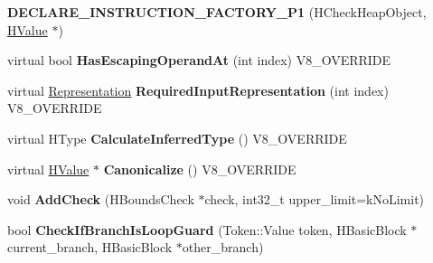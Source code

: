 \begin{DoxyCompactItemize}
\item 
\hypertarget{classv8_1_1internal_1_1_v8___f_i_n_a_l_a4567ad0527adfd674373af9969e5d0e3}{}{\bfseries D\+E\+C\+L\+A\+R\+E\+\_\+\+I\+N\+S\+T\+R\+U\+C\+T\+I\+O\+N\+\_\+\+F\+A\+C\+T\+O\+R\+Y\+\_\+\+P1} (H\+Check\+Heap\+Object, \hyperlink{classv8_1_1internal_1_1_h_value}{H\+Value} $\ast$)\label{classv8_1_1internal_1_1_v8___f_i_n_a_l_a4567ad0527adfd674373af9969e5d0e3}

\item 
\hypertarget{classv8_1_1internal_1_1_v8___f_i_n_a_l_ae559b1a39de93c2925ab5815da490738}{}virtual bool {\bfseries Has\+Escaping\+Operand\+At} (int index) V8\+\_\+\+O\+V\+E\+R\+R\+I\+D\+E\label{classv8_1_1internal_1_1_v8___f_i_n_a_l_ae559b1a39de93c2925ab5815da490738}

\item 
\hypertarget{classv8_1_1internal_1_1_v8___f_i_n_a_l_a6c6d1f37f40b113d8f4062f1ffff7215}{}virtual \hyperlink{classv8_1_1internal_1_1_representation}{Representation} {\bfseries Required\+Input\+Representation} (int index) V8\+\_\+\+O\+V\+E\+R\+R\+I\+D\+E\label{classv8_1_1internal_1_1_v8___f_i_n_a_l_a6c6d1f37f40b113d8f4062f1ffff7215}

\item 
\hypertarget{classv8_1_1internal_1_1_v8___f_i_n_a_l_a7a6782b8660ab150601db2ff28262edd}{}virtual H\+Type {\bfseries Calculate\+Inferred\+Type} () V8\+\_\+\+O\+V\+E\+R\+R\+I\+D\+E\label{classv8_1_1internal_1_1_v8___f_i_n_a_l_a7a6782b8660ab150601db2ff28262edd}

\item 
\hypertarget{classv8_1_1internal_1_1_v8___f_i_n_a_l_aad5f871e0a6782c02e742ec017eca3cd}{}virtual \hyperlink{classv8_1_1internal_1_1_h_value}{H\+Value} $\ast$ {\bfseries Canonicalize} () V8\+\_\+\+O\+V\+E\+R\+R\+I\+D\+E\label{classv8_1_1internal_1_1_v8___f_i_n_a_l_aad5f871e0a6782c02e742ec017eca3cd}

\item 
\hypertarget{classv8_1_1internal_1_1_v8___f_i_n_a_l_ab1b0e23a0de88deffbb6a53761c678c3}{}void {\bfseries Add\+Check} (H\+Bounds\+Check $\ast$check, int32\+\_\+t upper\+\_\+limit=k\+No\+Limit)\label{classv8_1_1internal_1_1_v8___f_i_n_a_l_ab1b0e23a0de88deffbb6a53761c678c3}

\item 
\hypertarget{classv8_1_1internal_1_1_v8___f_i_n_a_l_afd810d84a51eb041ec0397cb72c82eb7}{}bool {\bfseries Check\+If\+Branch\+Is\+Loop\+Guard} (Token\+::\+Value token, H\+Basic\+Block $\ast$current\+\_\+branch, H\+Basic\+Block $\ast$other\+\_\+branch)\label{classv8_1_1internal_1_1_v8___f_i_n_a_l_afd810d84a51eb041ec0397cb72c82eb7}


\end{DoxyCompactItemize}
